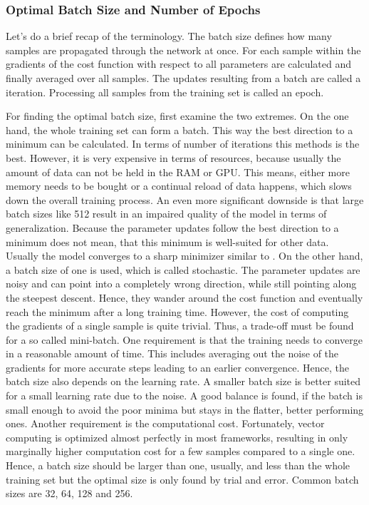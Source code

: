 \subsubsection{Optimal Batch Size and Number of Epochs}
\label{sec:improving-performance-batch-size}
Let's do a brief recap of the terminology.
The batch size defines how many samples are propagated through the network at once.
For each sample within the gradients of the cost function with respect to all parameters are calculated and finally averaged over all samples.
The updates resulting from a batch are called a iteration.
Processing all samples from the training set is called an epoch.

For finding the optimal batch size, first examine the two extremes.
On the one hand, the whole training set can form a batch.
This way the best direction to a minimum can be calculated.
In terms of number of iterations this methods is the best.
However, it is very expensive in terms of resources, because usually the amount of data can not be held in the RAM or GPU.
This means, either more memory needs to be bought or a continual reload of data happens, which slows down the overall training process.
An even more significant downside is that large batch sizes like 512 result in an impaired quality of the model in terms of generalization\cite{DBLP:journals/corr/KeskarMNST16}.
Because the parameter updates follow the best direction to a minimum does not mean, that this minimum is well-suited for other data.
Usually the model converges to a sharp minimizer similar to .
On the other hand, a batch size of one is used, which is called stochastic.
The parameter updates are noisy and can point into a completely wrong direction, while still pointing along the steepest descent.
Hence, they wander around the cost function and eventually reach the minimum after a long training time.
However, the cost of computing the gradients of a single sample is quite trivial.
Thus, a trade-off must be found for a so called mini-batch.
One requirement is that the training needs to converge in a reasonable amount of time.
This includes averaging out the noise of the gradients for more accurate steps leading to an earlier convergence.
Hence, the batch size also depends on the learning rate.
A smaller batch size is better suited for a small learning rate due to the noise.
A good balance is found, if the batch is small enough to avoid the poor minima but stays in the flatter, better performing ones.
Another requirement is the computational cost.
Fortunately, vector computing is optimized almost perfectly in most frameworks, resulting in only marginally higher computation cost for a few samples compared to a single one.
Hence, a batch size should be larger than one, usually, and less than the whole training set but the optimal size is only found by trial and error.
Common batch sizes are 32, 64, 128 and 256.

